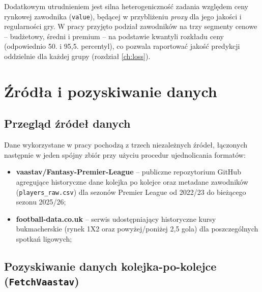 \documentclass[a4paper,twoside,11pt]{mwrep}
\theoremstyle{plain} \newtheorem{thm}{Twierdzenie}
\theoremstyle{plain} \newtheorem{lem}{Lemat}
\theoremstyle{definition} \newtheorem{defn}{Definicja}
\theoremstyle{remark} \newtheorem*{rem}{Wniosek}
\begin{document}
Dodatkowym utrudnieniem jest silna heterogeniczność zadania względem ceny
rynkowej zawodnika (\texttt{value}), będącej w przybliżeniu \emph{proxy} dla
jego jakości i regularności gry. W pracy przyjęto podział zawodników na
trzy segmenty cenowe -- budżetowy, średni i premium -- na podstawie
kwantyli rozkładu ceny (odpowiednio 50. i 95,5. percentyl), co pozwala
raportować jakość predykcji oddzielnie dla każdej grupy (rozdział
\ref{ch:loss}).

\chapter{Źródła i pozyskiwanie danych}\label{ch:dane}

\section{Przegląd źródeł danych}

Dane wykorzystane w pracy pochodzą z trzech niezależnych źródeł, łączonych
następnie w jeden spójny zbiór przy użyciu procedur ujednolicania formatów:

\begin{itemize}
    \item \textbf{vaastav/Fantasy-Premier-League} -- publiczne
    repozytorium GitHub agregujące historyczne dane kolejka po kolejce oraz metadane zawodników (\texttt{players\_raw.csv})
    dla sezonów Premier League od 2022/23 do bieżącego sezonu 2025/26;
    \item \textbf{football-data.co.uk} -- serwis udostępniający historyczne
    kursy bukmacherskie (rynek 1X2 oraz powyżej/poniżej 2,5 gola) dla
    poszczególnych spotkań ligowych;
\end{itemize}

\section{Pozyskiwanie danych kolejka-po-kolejce (\texttt{FetchVaastav})}
\end{document}
